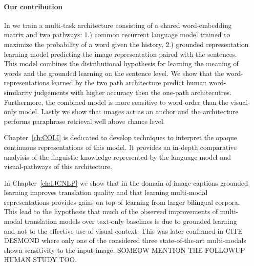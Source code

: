 \paragraph{Our contribution}


In \cite{chrupala2015learning} we train a multi-task architecture consisting
of a shared word-embedding matrix and two pathways: 1.) common recurrent language
model trained to maximize the probability of a word given the history,
2.) grounded representation learning model predicting the image representation paired with the sentences.
This model combines the distributional hypothesis for learning the meaning of words
and the grounded learning on the sentence level.
We show that the word-representations learned by the two path architecture
predict human word-similarity judgements with higher accuracy then the one-path
architecutres. Furthermore, the combined model is more sensitive to word-order than
the visual-only model.  Lastly we show that images act as an
anchor and the architecture performs paraphrase retrieval well above chance
level.

Chapter~\ref{ch:COLI} is dedicated to develop techniques to interpret the
opaque continuous representations of this model. It provides an in-depth
comparative analyisis of the linguistic knowledge represented by the
language-model and visual-pathways of this architecture.

In Chapter~\ref{ch:IJCNLP} we show that in the domain of image-captions
grounded learning improves translation quality and that learning multi-modal
representations provides gains on top of learning from larger bilingual corpora.
This lead to the hypothesis that much of the observed improvements of
multi-modal translation models over text-only baselines is due to grounded
learning and not to the effective use of visual context. This was later confirmed
in CITE DESMOND where only one of the considered three state-of-the-art multi-modals
shown sensitivity to the input image. SOMEOW MENTION THE FOLLOWUP HUMAN STUDY TOO.



